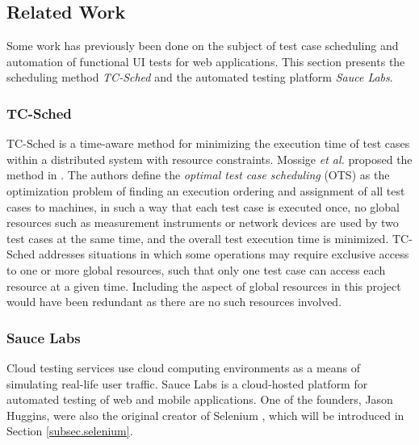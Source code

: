 \subsection{Related Work}
Some work has previously been done on the subject of test case scheduling and automation of functional UI tests for web applications. This section presents the scheduling method \emph{TC-Sched} and the automated testing platform \emph{Sauce Labs}.

\subsubsection{TC-Sched}
TC-Sched is a time-aware method for minimizing the execution time of test cases within a distributed system with resource constraints. Mossige \emph{et al.} proposed the method in \cite{tcsched}. The authors define the \emph{optimal test case scheduling} (OTS) as the optimization problem of finding an execution ordering and assignment of all test cases to machines, in such a way that each test case is executed once, no global resources such as measurement instruments or network devices are used by two test cases at the same time, and the overall test execution time is minimized. TC-Sched addresses situations in which some operations may require exclusive access to one or more global resources, such that only one test case can access each resource at a given time. Including the aspect of global resources in this project would have been redundant as there are no such resources involved.

\subsubsection{Sauce Labs}
Cloud testing services use cloud computing environments as a means of simulating real-life user traffic. Sauce Labs is a cloud-hosted platform for automated testing of web and mobile applications. One of the founders, Jason Huggins, were also the original creator of Selenium \cite{SauceLabsPressCoverage}, which will be introduced in Section \ref{subsec.selenium}.

